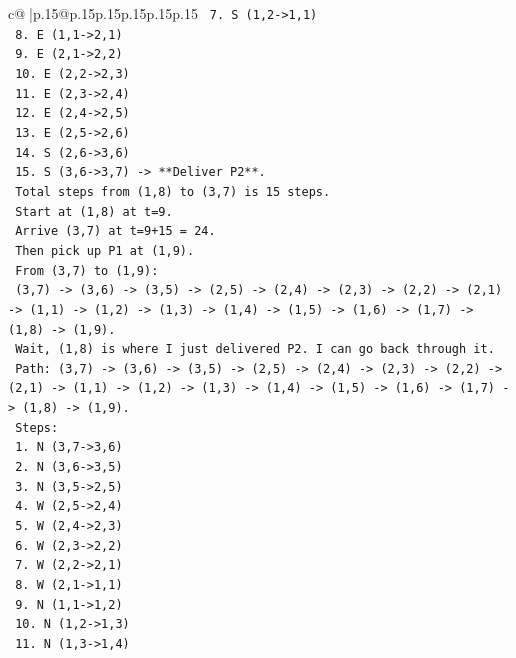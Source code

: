 \documentclass{article}
\begin{document}
{\begin{supertabular}{c@{$\;$}|p{.15\linewidth}@{}p{.15\linewidth}p{.15\linewidth}p{.15\linewidth}p{.15\linewidth}p{.15\linewidth}}
{{{\texttt{    7. S (1,2{-}>1,1)} \\
\texttt{    8. E (1,1{-}>2,1)} \\
\texttt{    9. E (2,1{-}>2,2)} \\
\texttt{    10. E (2,2{-}>2,3)} \\
\texttt{    11. E (2,3{-}>2,4)} \\
\texttt{    12. E (2,4{-}>2,5)} \\
\texttt{    13. E (2,5{-}>2,6)} \\
\texttt{    14. S (2,6{-}>3,6)} \\
\texttt{    15. S (3,6{-}>3,7) {-}> **Deliver P2**.} \\
\texttt{    Total steps from (1,8) to (3,7) is 15 steps.} \\
\texttt{    Start at (1,8) at t=9.} \\
\texttt{    Arrive (3,7) at t=9+15 = 24.} \\
\texttt{    Then pick up P1 at (1,9).} \\
\texttt{    From (3,7) to (1,9):} \\
\texttt{    (3,7) {-}> (3,6) {-}> (3,5) {-}> (2,5) {-}> (2,4) {-}> (2,3) {-}> (2,2) {-}> (2,1) {-}> (1,1) {-}> (1,2) {-}> (1,3) {-}> (1,4) {-}> (1,5) {-}> (1,6) {-}> (1,7) {-}> (1,8) {-}> (1,9).} \\
\texttt{    Wait, (1,8) is where I just delivered P2. I can go back through it.} \\
\texttt{    Path: (3,7) {-}> (3,6) {-}> (3,5) {-}> (2,5) {-}> (2,4) {-}> (2,3) {-}> (2,2) {-}> (2,1) {-}> (1,1) {-}> (1,2) {-}> (1,3) {-}> (1,4) {-}> (1,5) {-}> (1,6) {-}> (1,7) {-}> (1,8) {-}> (1,9).} \\
\texttt{    Steps:} \\
\texttt{    1. N (3,7{-}>3,6)} \\
\texttt{    2. N (3,6{-}>3,5)} \\
\texttt{    3. N (3,5{-}>2,5)} \\
\texttt{    4. W (2,5{-}>2,4)} \\
\texttt{    5. W (2,4{-}>2,3)} \\
\texttt{    6. W (2,3{-}>2,2)} \\
\texttt{    7. W (2,2{-}>2,1)} \\
\texttt{    8. W (2,1{-}>1,1)} \\
\texttt{    9. N (1,1{-}>1,2)} \\
\texttt{    10. N (1,2{-}>1,3)} \\
\texttt{    11. N (1,3{-}>1,4)} \\
}}}
\end{supertabular}}
\end{document}
